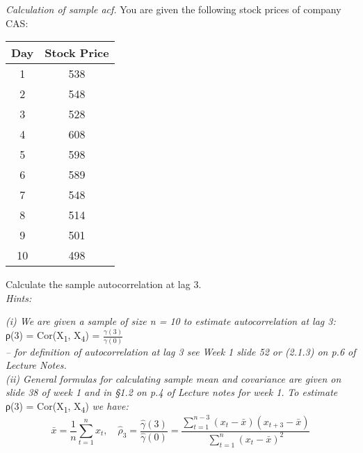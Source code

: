 \documentclass[
]{article}
\begin{document}
\emph{Calculation of sample acf.} You are given the following stock
prices of company CAS:

\begin{longtable}[]{@{}cc@{}}
\toprule()
Day & Stock Price \\
\midrule()
\endhead
1 & 538 \\
2 & 548 \\
3 & 528 \\
4 & 608 \\
5 & 598 \\
6 & 589 \\
7 & 548 \\
8 & 514 \\
9 & 501 \\
10 & 498 \\
\bottomrule()
\end{longtable}

Calculate the sample autocorrelation at lag 3.\\
\emph{Hints:}\\
\setlength{\leftskip}{2cm}

\emph{(i) We are given a sample of size n = 10 to estimate
autocorrelation at lag 3:} ρ(3) = Cor(X\textsubscript{1},
X\textsubscript{4}) = \(\frac{γ(3)}{γ(0)}\)\\
\emph{-- for definition of autocorrelation at lag 3 see Week 1 slide 52
or (2.1.3) on p.6 of Lecture Notes.}\\
\emph{(ii) General formulas for calculating sample mean and covariance
are given on slide 38 of week 1 and in §1.2 on p.4 of Lecture notes for
week 1.} \emph{To estimate} ρ(3) = Cor(X\textsubscript{1},
X\textsubscript{4}) \emph{we have:}\\
\[\bar{x}=\frac{1}{n} \sum_{t=1}^n x_t, \quad \hat{\rho}_3=\frac{\hat{\gamma}(3)}{\hat{\gamma}(0)}=\frac{\sum_{t=1}^{n-3}\left(x_t-\bar{x}\right)\left(x_{t+3}-\bar{x}\right)}{\sum_{t=1}^n\left(x_t-\bar{x}\right)^2}\]
\end{document}
